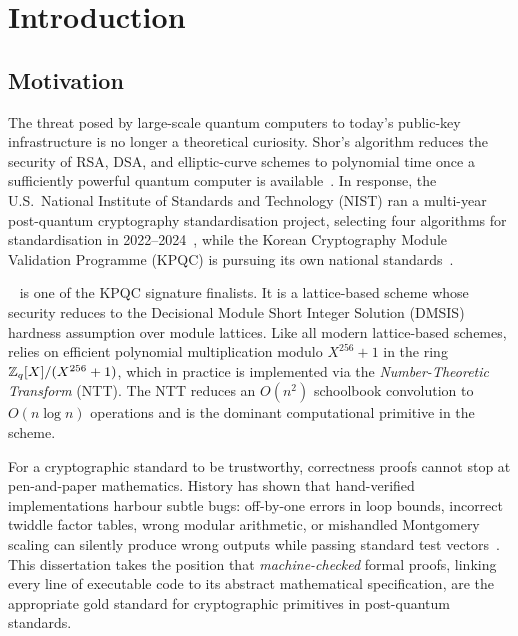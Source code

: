 
\chapter{Introduction}
\label{ch:intro}

\section{Motivation}

The threat posed by large-scale quantum computers to today's public-key
infrastructure is no longer a theoretical curiosity.  Shor's algorithm reduces
the security of RSA, DSA, and elliptic-curve schemes to polynomial time once a
sufficiently powerful quantum computer is available~\cite{Shor1994}.  In
response, the U.S.\ National Institute of Standards and Technology (NIST) ran
a multi-year post-quantum cryptography standardisation project, selecting four
algorithms for standardisation in 2022--2024~\cite{NIST2022}, while the Korean
Cryptography Module Validation Programme (KPQC) is pursuing its own national
standards~\cite{KPQC2022}.

\haetae{}~\cite{HAETAE2022} is one of the KPQC signature finalists.  It is a
lattice-based scheme whose security reduces to the Decisional Module
Short Integer Solution (DMSIS) hardness assumption over module lattices.  Like
all modern lattice-based schemes, \haetae{} relies on efficient polynomial
multiplication modulo $X^{256}+1$ in the ring $\mathbb{Z}_q[X]/(X^{256}+1)$, which
in practice is implemented via the \emph{Number-Theoretic Transform} (NTT).
The NTT reduces an $O(n^2)$ schoolbook convolution to $O(n \log n)$ operations
and is the dominant computational primitive in the scheme.

For a cryptographic standard to be trustworthy, correctness proofs cannot stop
at pen-and-paper mathematics.  History has shown that hand-verified
implementations harbour subtle bugs: off-by-one errors in loop bounds,
incorrect twiddle factor tables, wrong modular arithmetic, or mishandled
Montgomery scaling can silently produce wrong outputs while passing standard
test vectors~\cite{BerBuc2017}.  This dissertation takes the position that
\emph{machine-checked} formal proofs, linking every line of executable code to
its abstract mathematical specification, are the appropriate gold standard for
cryptographic primitives in post-quantum standards.

